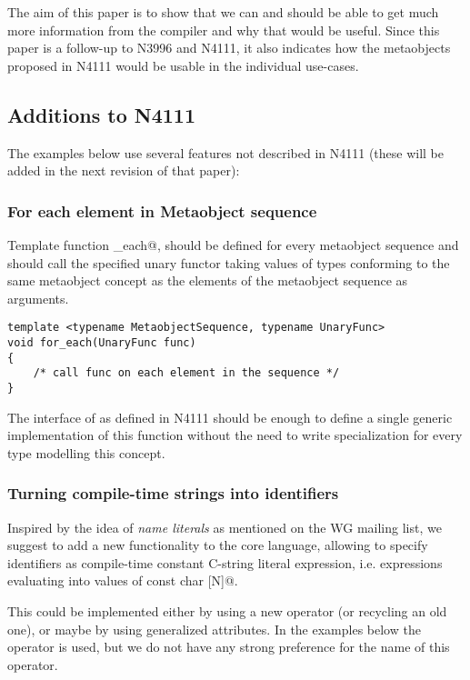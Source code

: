 The aim of this paper is to show that we can and should be able to get much more
information from the compiler and why that would be useful. Since this paper is a follow-up
to N3996 and N4111, it also indicates how the metaobjects proposed in N4111 would
be usable in the individual use-cases.

\subsection{Additions to N4111}

The examples below use several features not described in N4111 (these will be added
in the next revision of that paper):

\subsubsection{For each element in Metaobject sequence}

Template function \verb@for_each@, should be defined for every metaobject sequence
and should call the specified unary functor taking values of types conforming to
the same metaobject concept as the elements of the metaobject sequence as arguments.

\begin{verbatim}
template <typename MetaobjectSequence, typename UnaryFunc>
void for_each(UnaryFunc func)
{
	/* call func on each element in the sequence */
}
\end{verbatim}

The interface of  as defined in N4111 should be enough
to define a single generic implementation of this function without the need
to write specialization for every type modelling this concept.

\subsubsection{Turning compile-time strings into identifiers}

Inspired by the idea of {\em name literals} as mentioned on the WG mailing list,
we suggest to add a new functionality to the core language, allowing to specify
identifiers as compile-time constant C-string literal expression, i.e. expressions
evaluating into values of \verb@constexpr const char [N]@.

This could be implemented either by using a new operator (or recycling an old one),
or maybe by using generalized attributes.
In the examples below the \verb@identifier@ operator is used, but we do not have
any strong preference for the name of this operator.

